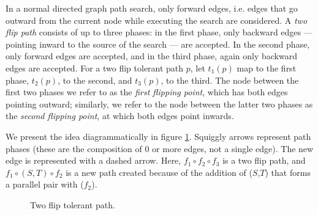 \documentclass[sigplan,review,anonymous]{acmart}
\begin{document}
In a normal directed graph path search, only forward edges, i.e. edges that go outward from the current node while executing the search are considered. 
A \textit{two flip path} consists of up to three phases: in the first phase, only backward edges --- pointing inward to the source of the search --- are accepted.
In the second phase, only forward edges are accepted, and in the third phase, again only backward edges are accepted.
For a two flip tolerant path $p$, let $t_1(p)$ map to the first phase, $t_2(p)$, to the second, and $t_3(p)$, to the third.
The node between the first two phases we refer to as the \textit{first flipping point}, which has both edges pointing outward; similarly, we refer to the node between the latter two phases as the \textit{second flipping point}, at which both edges point inwards.

We present the idea diagrammatically in figure \ref{figure_two_flip}.
Squiggly arrows represent path phases (these are the composition of 0 or more edges, not a single edge).
The new edge is represented with a dashed arrow.
Here, $f_1 \circ f_2 \circ f_3$ is a two flip path, and $f_1 \circ (S, T) \circ f_2$ is a new path created because of the addition of ($S$,$T$) that forms a parallel pair with ($f_2$).

\begin{figure}
\begin{center}
\end{center}
\caption{Two flip tolerant path.}
\label{figure_two_flip}
\end{figure}
\end{document}
